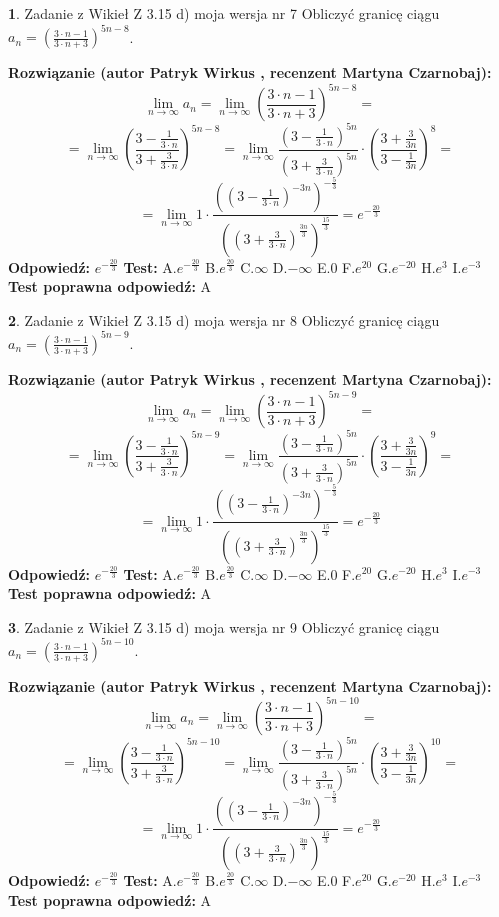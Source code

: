 \documentclass[12pt, a4paper]{article}
\theoremstyle{definition} %
\newtheorem{zad}{}
\newcommand{\zadStart}[1]{\begin{zad}#1\newline}
\newcommand{\zadStop}{\end{zad}}
\newcommand{\rozwStart}[2]{\noindent \textbf{Rozwiązanie (autor #1 , recenzent #2): }\newline}
\newcommand{\rozwStop}{\newline}
\newcommand{\odpStart}{\noindent \textbf{Odpowiedź:}\newline}
\newcommand{\odpStop}{\newline}
\newcommand{\testStart}{\noindent \textbf{Test:}\newline}
\newcommand{\testStop}{\newline}
\newcommand{\kluczStart}{\noindent \textbf{Test poprawna odpowiedź:}\newline}
\newcommand{\kluczStop}{\newline}
\begin{document}
\zadStart{Zadanie z Wikieł Z 3.15 d) moja wersja nr 7}
Obliczyć granicę ciągu $a_{n}=(\frac{3\cdot n - 1}{3 \cdot n + 3})^{5n-8}$.
\zadStop
\rozwStart{Patryk Wirkus}{Martyna Czarnobaj}
$$\lim\limits_{n\to\infty} a_{n} = \lim\limits_{n\to\infty}(\frac{3\cdot n - 1}{3 \cdot n + 3})^{5n-8}=$$
$$=\lim\limits_{n\to\infty}(\frac{3 - \frac{1}{3\cdot n}}{3 + \frac{3}{3 \cdot n}})^{5n-8}=\lim\limits_{n\to\infty}\frac{(3 - \frac{1}{3\cdot n})^{5n}}{(3 + \frac{3}{3\cdot n})^{5n}} \cdot (\frac{3+\frac{3}{3n}}{3-\frac{1}{3n}})^{8}=$$
$$=\lim\limits_{n\to\infty} 1 \cdot \frac{((3-\frac{1}{3 \cdot n})^{-3n})^{-\frac{5}{3}}}{((3+\frac{3}{3 \cdot n})^{\frac{3n}{3}})^{\frac{15}{3}}} =e^{-\frac{20}{3}}$$
\rozwStop
\odpStart
$e^{-\frac{20}{3}}$
\odpStop
\testStart
A.$ e^{-\frac{20}{3}}$
B.$ e^{\frac{20}{3}}$
C.$\infty$
D.$-\infty$
E.$0$
F.$e^{20}$
G.$e^{-20}$
H.$e^{3}$
I.$e^{-3}$
\testStop
\kluczStart
A
\kluczStop



\zadStart{Zadanie z Wikieł Z 3.15 d) moja wersja nr 8}
Obliczyć granicę ciągu $a_{n}=(\frac{3\cdot n - 1}{3 \cdot n + 3})^{5n-9}$.
\zadStop
\rozwStart{Patryk Wirkus}{Martyna Czarnobaj}
$$\lim\limits_{n\to\infty} a_{n} = \lim\limits_{n\to\infty}(\frac{3\cdot n - 1}{3 \cdot n + 3})^{5n-9}=$$
$$=\lim\limits_{n\to\infty}(\frac{3 - \frac{1}{3\cdot n}}{3 + \frac{3}{3 \cdot n}})^{5n-9}=\lim\limits_{n\to\infty}\frac{(3 - \frac{1}{3\cdot n})^{5n}}{(3 + \frac{3}{3\cdot n})^{5n}} \cdot (\frac{3+\frac{3}{3n}}{3-\frac{1}{3n}})^{9}=$$
$$=\lim\limits_{n\to\infty} 1 \cdot \frac{((3-\frac{1}{3 \cdot n})^{-3n})^{-\frac{5}{3}}}{((3+\frac{3}{3 \cdot n})^{\frac{3n}{3}})^{\frac{15}{3}}} =e^{-\frac{20}{3}}$$
\rozwStop
\odpStart
$e^{-\frac{20}{3}}$
\odpStop
\testStart
A.$ e^{-\frac{20}{3}}$
B.$ e^{\frac{20}{3}}$
C.$\infty$
D.$-\infty$
E.$0$
F.$e^{20}$
G.$e^{-20}$
H.$e^{3}$
I.$e^{-3}$
\testStop
\kluczStart
A
\kluczStop



\zadStart{Zadanie z Wikieł Z 3.15 d) moja wersja nr 9}
Obliczyć granicę ciągu $a_{n}=(\frac{3\cdot n - 1}{3 \cdot n + 3})^{5n-10}$.
\zadStop
\rozwStart{Patryk Wirkus}{Martyna Czarnobaj}
$$\lim\limits_{n\to\infty} a_{n} = \lim\limits_{n\to\infty}(\frac{3\cdot n - 1}{3 \cdot n + 3})^{5n-10}=$$
$$=\lim\limits_{n\to\infty}(\frac{3 - \frac{1}{3\cdot n}}{3 + \frac{3}{3 \cdot n}})^{5n-10}=\lim\limits_{n\to\infty}\frac{(3 - \frac{1}{3\cdot n})^{5n}}{(3 + \frac{3}{3\cdot n})^{5n}} \cdot (\frac{3+\frac{3}{3n}}{3-\frac{1}{3n}})^{10}=$$
$$=\lim\limits_{n\to\infty} 1 \cdot \frac{((3-\frac{1}{3 \cdot n})^{-3n})^{-\frac{5}{3}}}{((3+\frac{3}{3 \cdot n})^{\frac{3n}{3}})^{\frac{15}{3}}} =e^{-\frac{20}{3}}$$
\rozwStop
\odpStart
$e^{-\frac{20}{3}}$
\odpStop
\testStart
A.$ e^{-\frac{20}{3}}$
B.$ e^{\frac{20}{3}}$
C.$\infty$
D.$-\infty$
E.$0$
F.$e^{20}$
G.$e^{-20}$
H.$e^{3}$
I.$e^{-3}$
\testStop
\kluczStart
A
\kluczStop
\end{document}
